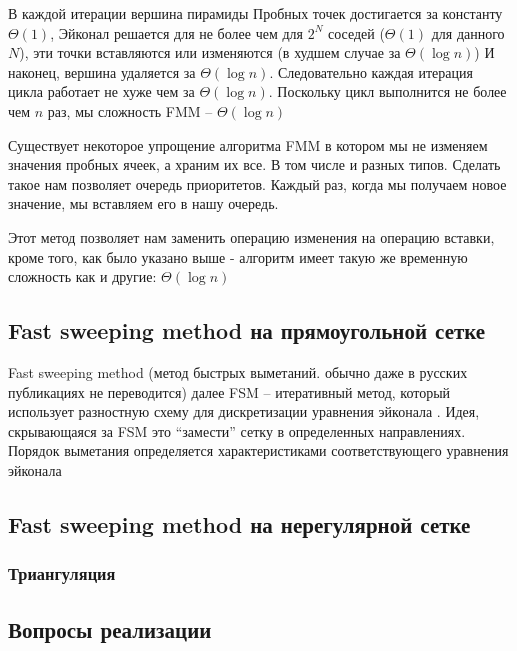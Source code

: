 В каждой итерации вершина пирамиды Пробных точек достигается за
константу $\Theta(1)$, Эйконал решается для не более чем для $2^N$
соседей ($\Theta(1)$ для данного $N$), эти точки вставляются или
изменяются (в худшем случае за $\Theta(\log n)$) И наконец, вершина
удаляется за $\Theta(\log n)$. Следовательно каждая итерация цикла
работает не хуже чем за $\Theta(\log n)$. Поскольку цикл выполнится не
более чем $n$ раз, мы сложность FMM -- $\Theta(\log n)$

Существует некоторое упрощение алгоритма FMM в котором мы не изменяем
значения пробных ячеек, а храним их все. В том числе и разных
типов. Сделать такое нам позволяет очередь приоритетов. Каждый раз,
когда мы получаем новое значение, мы вставляем его в нашу очередь.

Этот метод позволяет нам заменить операцию изменения на операцию
вставки, кроме того, как было указано выше - алгоритм имеет такую же
временную сложность как и другие: $\Theta(\log n)$

\subsection{Fast sweeping method на прямоугольной сетке}
\label{sec:fast-sweeping-method}

Fast sweeping method (метод быстрых выметаний. обычно даже в
русских публикациях не переводится) далее FSM -- итеративный метод, который
использует разностную схему для дискретизации уравнения эйконала
\cite{F2005}. Идея, скрывающаяся за FSM это ``замести'' сетку в
определенных направлениях. Порядок выметания определяется
характеристиками соответствующего уравнения эйконала

\subsection{Fast sweeping method на нерегулярной сетке}
\label{sec:unstructured-mesh}

\subsubsection{Триангуляция}
\label{sec:triangulate}

\subsection{Вопросы реализации}
\label{sec:programming}



